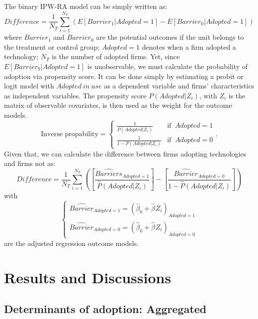 \documentclass[a4paper,11pt]{article}
\begin{document}
The binary IPW-RA model can be simply written as:
\begin{equation}
	Difference = \frac{1}{N_T}\sum_{i=1}^{N_T} \left( E[Barrier_1 | Adopted = 1] - E[Barrier_0 | Adopted = 1] \right)
\end{equation}
where $Barrier_1$ and $Barrier_0$ are the potential outcomes if the unit belongs to the treatment or control group; $Adopted = 1$ denotes when a firm adopted a technology; $N_T$ is the number of adopted firms. Yet, since $E[Barrier_0 | Adopted = 1]$ is unobservable, we must calculate the probability of adoption via propensity score. It can be done simply by estimating a probit or logit model with $Adopted \ in \ use$ as a dependent variable and firms' characteristics as independent variables. The propensity score $P(Adopted|Z_i)$, with $Z_i$ is the matrix of observable covariates, is then used as the weight for the outcome models.
\begin{equation}
	\mbox{Inverse propability} = \left\{ \begin{array}{cl}
		\frac{1}{P(Adopted|Z_i)} & \mbox{if } \ Adopted = 1 \\
		\frac{1}{1-P(Adopted|Z_i)} & \mbox{if } \ Adopted = 0
	\end{array} \right.
	.
\end{equation}
Given that, we can calculate the difference between firms adopting technologies and firms not as:
\begin{equation}
	Difference = \frac{1}{N_T}\sum_{i=1}^{N_T}  \left(  \left[  \frac{\widehat{Barriers}_{Adopted=1}}{\hat P(Adopted|Z_i)}\right] - \left[  \frac{\widehat{Barrier}_{Adopted=0}}{1- \hat P(Adopted|Z_i)}\right]\right)  
\end{equation}
with
\begin{equation}
	\left\{ \begin{array}{cl}
		\widehat{Barrier}_{Adopted=1} = \left( \hat{\beta}_{0} + \hat{\beta}_{} Z_{i} \right)_{Adopted=1} \\
		\widehat{Barrier}_{Adopted=0} = \left( \hat{\beta}_{0} + \hat{\beta}_{} Z_{i} \right)_{Adopted=0}
	\end{array} \right.
\end{equation}
are the adjusted regression outcome models. 

\section{Results and Discussions}\label{result}

\subsection{Determinants of adoption: Aggregated}\label{res-agg}
\end{document}

